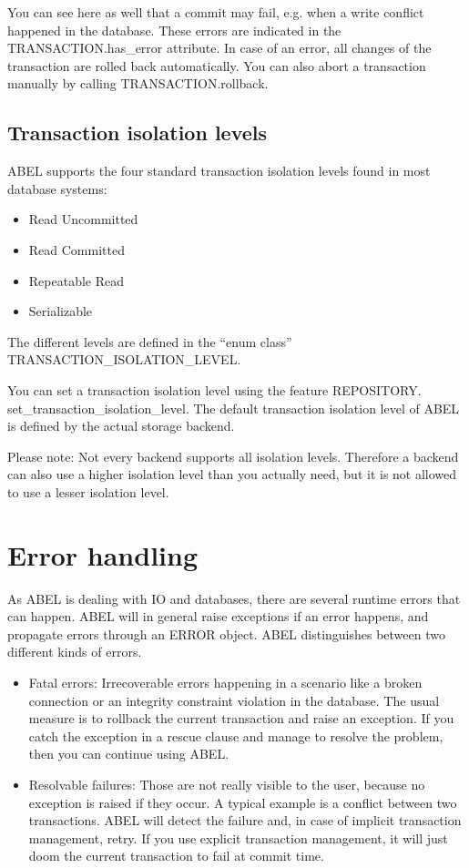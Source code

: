 You can see here as well that a commit may fail, e.g. when a write conflict happened in the database.
These errors are indicated in the TRANSACTION.has\_error attribute.
In case of an error, all changes of the transaction are rolled back automatically.
You can also abort a transaction manually by calling TRANSACTION.rollback. 

\subsection{Transaction isolation levels}

ABEL supports the four standard transaction isolation levels found in most database systems:
\begin{itemize}
 \item Read Uncommitted
 \item Read Committed
 \item Repeatable Read
 \item Serializable
\end{itemize}

The different levels are defined in the ``enum class'' TRANSACTION\_\-ISOLATION\_LEVEL.

You can set a transaction isolation level using the feature REPOSITORY. set\_\-transaction\_isolation\_level.
The default transaction isolation level of ABEL is defined by the actual storage backend.

Please note: Not every backend supports all isolation levels.
Therefore a backend can also use a higher isolation level than you actually need, but it is not allowed to use a lesser isolation level.



\section{Error handling}

As ABEL is dealing with IO and databases, there are several runtime errors that can happen. 
ABEL will in general raise exceptions if an error happens, and propagate errors through an ERROR object.
ABEL distinguishes between two different kinds of errors.

\begin{itemize}

\item Fatal errors: Irrecoverable errors happening in a scenario like a broken connection or an integrity constraint violation in the database.
The usual measure is to rollback the current transaction and raise an exception. 
If you catch the exception in a rescue clause and manage to resolve the problem, then you can continue using ABEL.

\item Resolvable failures: Those are not really visible to the user, because no exception is raised if they occur.
A typical example is a conflict between two transactions.
ABEL will detect the failure and, in case of implicit transaction management, retry.
If you use explicit transaction management, it will just doom the current transaction to fail at commit time.
\end{itemize}


